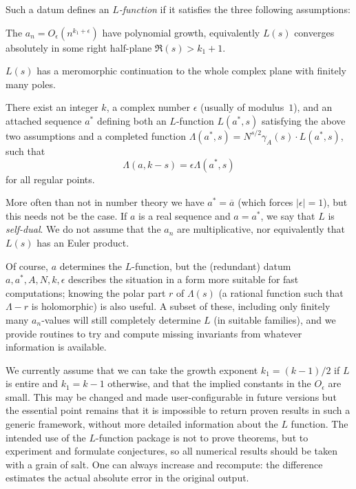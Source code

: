 Such a datum defines an \emph{$L$-function} if it satisfies the three
following assumptions:

\item [Convergence] The $a_n = O_\epsilon(n^{k_1+\epsilon})$ have polynomial
growth, equivalently $L(s)$ converges absolutely in some right half-plane
$\Re(s) > k_1 + 1$.

\item [Analytic continuation] $L(s)$ has a meromorphic continuation to the
whole complex plane with finitely many poles.

\item [Functional equation] There exist an integer $k$, a complex number
$\epsilon$ (usually of modulus~$1$), and an attached sequence $a^*$
defining both an $L$-function $L(a^*,s)$ satisfying the above two assumptions
and a completed function $\Lambda(a^*,s) = N^{s/2}\gamma_A(s) \cdot
L(a^*,s)$, such that
$$\Lambda(a,k-s) = \epsilon \Lambda(a^*,s)$$
for all regular points.

More often than not in number theory we have $a^* = \overline{a}$ (which
forces $|\epsilon| = 1$), but this needs not be the case. If $a$ is a real
sequence and $a = a^*$, we say that $L$ is \emph{self-dual}. We do not assume
that the $a_n$ are multiplicative, nor equivalently that $L(s)$ has an Euler
product.

Of course, $a$ determines the $L$-function, but the (redundant) datum $a,a^*,
A, N, k, \epsilon$ describes the situation in a form more suitable for fast
computations; knowing the polar part $r$ of $\Lambda(s)$ (a rational function
such that $\Lambda-r$ is holomorphic) is also useful. A subset of these,
including only finitely many $a_n$-values will still completely determine $L$
(in suitable families), and we provide routines to try and compute missing
invariants from whatever information is available.

We currently assume that we can take the growth exponent $k_1 = (k-1)/2$ if
$L$ is entire and $k_1 = k-1$ otherwise, and that the implied constants in
the $O_\epsilon$ are small. This may be changed and made user-configurable
in future versions but the essential point remains that it is impossible to
return proven results in such a generic framework, without more detailed
information about the $L$ function. The intended use of the $L$-function
package is not to prove theorems, but to experiment and formulate
conjectures, so all numerical results should be taken with a grain of salt.
One can always increase  and recompute: the difference
estimates the actual absolute error in the original output.

